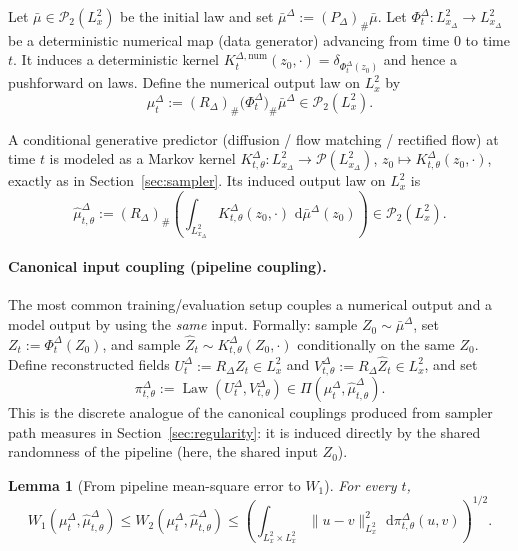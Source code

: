 \documentclass{article}
\numberwithin{equation}{section}
\theoremstyle{plain}
\newtheorem{lemma}[theorem]{Lemma}
\theoremstyle{definition}
\theoremstyle{remark}
\newcommand{\Pcal}{\mathcal{P}}
\newcommand{\dd}{\,\mathrm{d}}
\DeclareMathOperator{\Law}{Law}
\begin{document}
Let $\bar\mu\in\Pcal_2(L^2_x)$ be the initial law and set $\bar\mu^\Delta:=(P_\Delta)_\#\bar\mu$.
Let $\Phi_t^\Delta:L^2_{x_\Delta}\to L^2_{x_\Delta}$ be a deterministic numerical map (data generator) advancing from time $0$ to time $t$.
It induces a deterministic kernel $K^{\Delta,\mathrm{num}}_t(z_0,\cdot)=\delta_{\Phi_t^\Delta(z_0)}$ and hence a pushforward on laws.
Define the numerical output law on $L^2_x$ by
\begin{equation}\label{eq:app-num-law}
\mu_t^\Delta := (R_\Delta)_\#\big(\Phi_t^\Delta\big)_\#\bar\mu^\Delta \in \Pcal_2(L^2_x).
\end{equation}

A conditional generative predictor (diffusion / flow matching / rectified flow) at time $t$ is modeled as a Markov kernel
$K^\Delta_{t,\theta}:L^2_{x_\Delta}\to\Pcal(L^2_{x_\Delta})$, $z_0\mapsto K^\Delta_{t,\theta}(z_0,\cdot)$, exactly as in
Section~\ref{sec:sampler}. Its induced output law on $L^2_x$ is
\begin{equation}\label{eq:app-diff-law}
\widehat\mu^\Delta_{t,\theta}
:=
(R_\Delta)_\#\left(\int_{L^2_{x_\Delta}} K^\Delta_{t,\theta}(z_0,\cdot)\,\dd\bar\mu^\Delta(z_0)\right)\in\Pcal_2(L^2_x).
\end{equation}


\paragraph{Canonical input coupling (pipeline coupling).}
The most common training/evaluation setup couples a numerical output and a model output by using the \emph{same} input.
Formally: sample $Z_0\sim\bar\mu^\Delta$, set $Z_t:=\Phi_t^\Delta(Z_0)$, and sample $\widehat Z_t\sim K^\Delta_{t,\theta}(Z_0,\cdot)$
conditionally on the same $Z_0$. Define reconstructed fields
$U_t^\Delta:=R_\Delta Z_t\in L^2_x$ and $V^\Delta_{t,\theta}:=R_\Delta \widehat Z_t\in L^2_x$, and set
\begin{equation}\label{eq:app-pi}
\pi^\Delta_{t,\theta}:=\Law(U_t^\Delta,V^\Delta_{t,\theta})\in\Pi(\mu_t^\Delta,\widehat\mu^\Delta_{t,\theta}).
\end{equation}
This is the discrete analogue of the canonical couplings produced from sampler path measures in Section~\ref{sec:regularity}:
it is induced directly by the shared randomness of the pipeline (here, the shared input $Z_0$).

\begin{lemma}[From pipeline mean-square error to $W_1$]\label{lem:app-mse-to-W1}
For every $t$,
\[
W_1(\mu_t^\Delta,\widehat\mu_{t,\theta}^\Delta)
\le W_2(\mu_t^\Delta,\widehat\mu_{t,\theta}^\Delta)
\le \left(\int_{L^2_x\times L^2_x}\|u-v\|_{L^2_x}^2\,\dd\pi^\Delta_{t,\theta}(u,v)\right)^{1/2}.
\]
\end{lemma}
\end{document}
